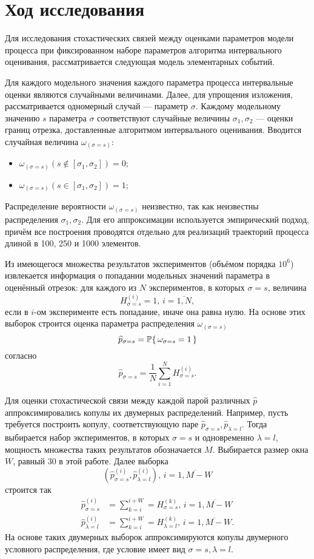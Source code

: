 \chapter{Ход исследования}	%

Для исследования стохастических связей между оценками параметров модели процесса при фиксированном наборе параметров алгоритма интервального оценивания, рассматривается следующая модель элементарных событий.

Для каждого модельного значения каждого параметра процесса интервальные оценки являются случайными величинами. Далее, для упрощения изложения, рассматривается одномерный случай --- параметр $\sigma$. Каждому модельному значению $s$ параметра $\sigma$ соответствуют случайные величины $\sigma_1, \sigma_2$ --- оценки границ отрезка, доставленные алгоритмом интервального оценивания. Вводится случайная величина $\omega_{(\sigma = s)}$:
  \begin{itemize}
    \item $\omega_{(\sigma = s)}(s \notin [\sigma_1, \sigma_2]) = 0$;
    \item $\omega_{(\sigma = s)}(s \in [\sigma_1, \sigma_2]) = 1$;
  \end{itemize}

Распределение вероятности $\omega_{(\sigma = s)}$ неизвестно, так как неизвестны распределения $\sigma_1, \sigma_2$. Для его аппроксимации используется эмпирический подход, причём все построения проводятся отдельно для реализаций траекторий процесса длиной в 100, 250 и 1000 элементов.

Из имеющегося множества результатов экспериментов (объёмом порядка $10^6$) извлекается информация  о попадании модельных значений параметра в оценённый отрезок: для каждого из $N$ экспериментов, в которых $\sigma = s$, величина
\[
H_{\sigma = s}^{(i)} = 1,\, i=\overline{1, N},
\]
если в $i$-ом эксперименте есть попадание, иначе она равна нулю. На основе этих выборок строится оценка параметра распределения $\omega_{(\sigma = s)}$
\[
\widehat{p}_{\sigma = s} = \P\{\, \omega_{\sigma = s} = 1\,\}
\]
согласно
\[
\widehat{p}_{\sigma = s} = \frac{1}{N} \sum_{i=1}^N H_{\sigma = s}^{(i)}.
\]

Для оценки стохастической связи между каждой парой различных $\widehat{p}$ аппроксимировались копулы их двумерных распределений. Например, пусть требуется построить копулу, соответствующую паре $\widehat{p}_{\sigma = s}, \widehat{p}_{\lambda = l}$. Тогда выбирается набор экспериментов, в которых $\sigma = s$ и одновременно $\lambda = l$, мощность множества таких результатов обозначается $M$. Выбирается размер окна $W$, равный 30 в этой работе. Далее выборка
\[
(\widehat{p}_{\sigma = s}^{(i)}, \widehat{p}_{\lambda = l}^{(i)}),\, i = \overline{1, M - W}
\]
строится так
\begin{align}
	\widehat{p}_{\sigma = s}^{(i)}  &= \sum_{k=i}^{i + W} = H_{\sigma = s}^{(k)},\, i = \overline{1, M - W} \\
	\widehat{p}_{\lambda = l}^{(i)} &= \sum_{k=i}^{i + W} = H_{\lambda = l}^{(k)},\, i = \overline{1, M - W}.
\end{align}
На основе таких двумерных выборок аппроксимируются копулы двумерного условного распределения, где условие имеет вид ${\sigma = s},  {\lambda = l}$.

